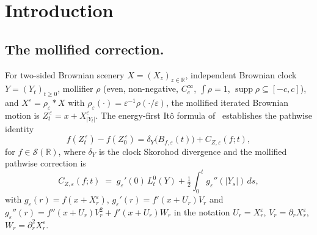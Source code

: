\documentclass[11pt,reqno]{amsart}
\theoremstyle{plain}
\theoremstyle{definition}
\theoremstyle{remark}
\newcommand{\R}{\mathbb{R}}
\newcommand{\IBM}{Z}
\DeclareMathOperator{\supp}{supp}
\begin{document}
\maketitle

\section{Introduction}\label{sec:intro}

\subsection*{The mollified correction.}
For two-sided Brownian scenery $X=(X_z)_{z\in\R}$, independent
Brownian clock $Y=(Y_t)_{t\ge 0}$, mollifier $\rho$ (even,
non-negative, $C_c^\infty$, $\int\rho=1$,
$\supp\rho\subseteq[-c,c]$), and
$X^\varepsilon=\rho_\varepsilon*X$ with
$\rho_\varepsilon(\cdot)=\varepsilon^{-1}\rho(\cdot/\varepsilon)$,
the mollified iterated Brownian motion is
$\IBM_t^{\,\varepsilon}=x+X^\varepsilon_{|Y_t|}$. The
energy-first It\^o formula of~\cite{Fontes-EnergyFirst} establishes
the pathwise identity
\begin{equation}\label{eq:flagship}
 f(\IBM_t^{\,\varepsilon})-f(\IBM_0^{\,\varepsilon})
  =\delta_Y\bigl(B_{f,\varepsilon}(t)\bigr)
  +C_{\IBM,\varepsilon}(f;t),
\end{equation}
for $f\in\mathscr S(\R)$, where $\delta_Y$ is the clock Skorohod
divergence and the mollified pathwise correction is
\begin{equation}\label{eq:Ceps}
 C_{\IBM,\varepsilon}(f;t)
  \;=\;g_\varepsilon'(0)\,L_t^{0}(Y)
  +\tfrac12\!\int_0^t g_\varepsilon''(|Y_s|)\,ds,
\end{equation}
with $g_\varepsilon(r)=f(x+X^\varepsilon_r)$,
$g_\varepsilon'(r)=f'(x+U_r)V_r$ and
$g_\varepsilon''(r)=f''(x+U_r)V_r^{2}+f'(x+U_r)W_r$ in the notation
$U_r=X^\varepsilon_r$, $V_r=\partial_rX^\varepsilon_r$,
$W_r=\partial_r^2X^\varepsilon_r$.
\end{document}

